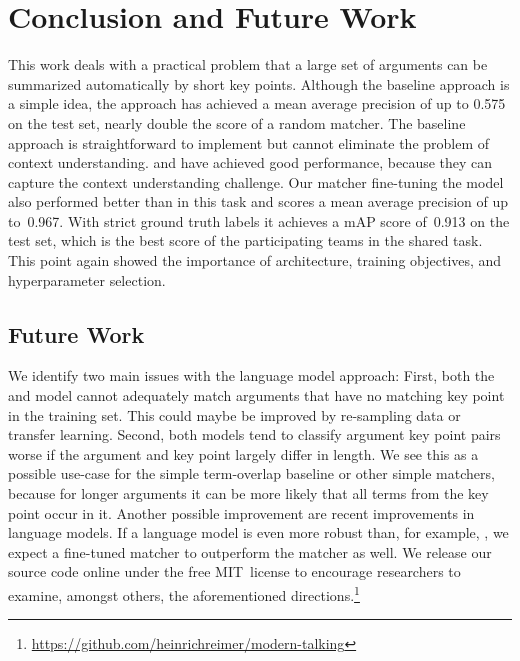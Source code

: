 \section{Conclusion and Future Work}\label{conclusion}


This work deals with a practical problem that a large set of arguments can be summarized automatically by short key points.
Although the baseline approach is a simple idea, the approach has achieved a mean average precision of up to 0.575 on the test set, nearly double the score of a random matcher. 
The baseline approach is straightforward to implement but cannot eliminate the problem of context understanding. 
\Roberta and \Bert have achieved good performance, because they can capture the context understanding challenge. 
Our matcher fine-tuning the \RobertaBase model also performed better than \Bert in this task and scores a mean average precision of up to~0.967. %
With strict ground truth labels it achieves a mAP score of~0.913 on the test set, which is the best score of the participating teams in the shared task.
This point again showed the importance of architecture, training objectives, and hyperparameter selection.

\subsection{Future Work}

We identify two main issues with the language model approach:
First, both the \BertBase and \RobertaBase model cannot adequately match arguments that have no matching key point in the training set.
This could maybe be improved by re-sampling data or transfer learning.
Second, both models tend to classify argument key point pairs worse if the argument and key point largely differ in length.
We see this as a possible use-case for the simple term-overlap baseline or other simple matchers, because for longer arguments it can be more likely that all terms from the key point occur in it.
Another possible improvement are recent improvements in language models. %
If a language model is even more robust than, for example, \Roberta, we expect a fine-tuned matcher to outperform the \RobertaBase matcher as well.
We release our source code online under the free MIT~license to encourage researchers to examine, amongst others, the aforementioned directions.\footnote{\url{https://github.com/heinrichreimer/modern-talking}}